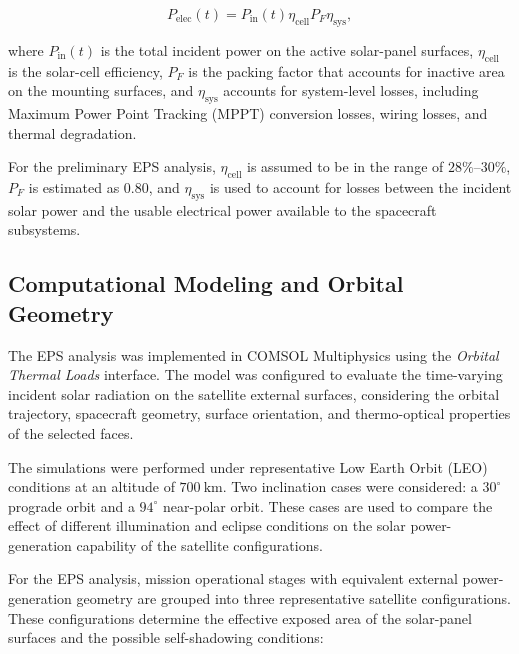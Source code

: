 \begin{equation}
P_{\mathrm{elec}}(t)
=
P_{\mathrm{in}}(t)
\eta_{\mathrm{cell}}
P_F
\eta_{\mathrm{sys}},
\label{eq:eps_electrical_power_conversion}
\end{equation}

where \(P_{\mathrm{in}}(t)\) is the total incident power on the active solar-panel surfaces, \(\eta_{\mathrm{cell}}\) is the solar-cell efficiency, \(P_F\) is the packing factor that accounts for inactive area on the mounting surfaces, and \(\eta_{\mathrm{sys}}\) accounts for system-level losses, including Maximum Power Point Tracking (MPPT) conversion losses, wiring losses, and thermal degradation.

For the preliminary EPS analysis, \(\eta_{\mathrm{cell}}\) is assumed to be in the range of \(28\%\)--\(30\%\), \(P_F\) is estimated as \(0.80\), and \(\eta_{\mathrm{sys}}\) is used to account for losses between the incident solar power and the usable electrical power available to the spacecraft subsystems.

\subsection{Computational Modeling and Orbital Geometry}
\label{sub:eps_computational_modeling_orbital_geometry}

The EPS analysis was implemented in COMSOL Multiphysics using the \textit{Orbital Thermal Loads} interface. The model was configured to evaluate the time-varying incident solar radiation on the satellite external surfaces, considering the orbital trajectory, spacecraft geometry, surface orientation, and thermo-optical properties of the selected faces.

The simulations were performed under representative Low Earth Orbit (LEO) conditions at an altitude of \(700~\mathrm{km}\). Two inclination cases were considered: a \(30^\circ\) prograde orbit and a \(94^\circ\) near-polar orbit. These cases are used to compare the effect of different illumination and eclipse conditions on the solar power-generation capability of the satellite configurations.

For the EPS analysis, mission operational stages with equivalent external power-generation geometry are grouped into three representative satellite configurations. These configurations determine the effective exposed area of the solar-panel surfaces and the possible self-shadowing conditions:

